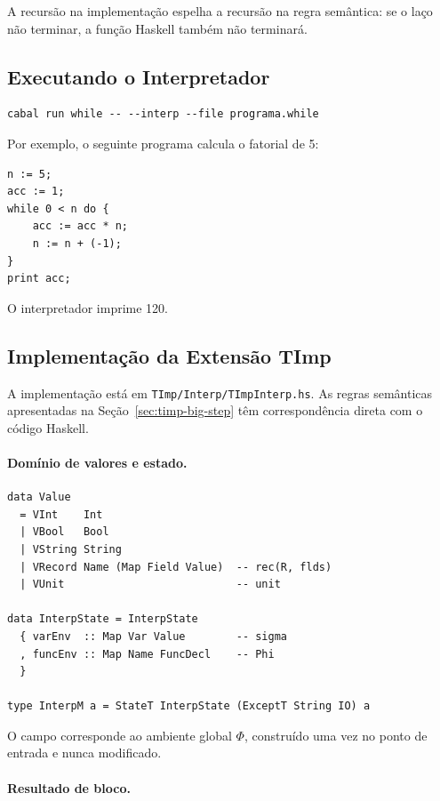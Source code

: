 A recursão na implementação espelha a recursão na regra semântica: se
o laço não terminar, a função Haskell também não terminará.

\subsection{Executando o Interpretador}

\begin{verbatim}
cabal run while -- --interp --file programa.while
\end{verbatim}

Por exemplo, o seguinte programa calcula o fatorial de 5:

\begin{verbatim}
n := 5;
acc := 1;
while 0 < n do {
    acc := acc * n;
    n := n + (-1);
}
print acc;
\end{verbatim}

O interpretador imprime 120.

\subsection{Implementação da Extensão TImp}

A implementação está em \verb|TImp/Interp/TImpInterp.hs|. As regras
semânticas apresentadas na Seção~\ref{sec:timp-big-step} têm
correspondência direta com o código Haskell.

\paragraph{Domínio de valores e estado.}

\begin{verbatim}
data Value
  = VInt    Int
  | VBool   Bool
  | VString String
  | VRecord Name (Map Field Value)  -- rec(R, flds)
  | VUnit                           -- unit

data InterpState = InterpState
  { varEnv  :: Map Var Value        -- sigma
  , funcEnv :: Map Name FuncDecl    -- Phi
  }

type InterpM a = StateT InterpState (ExceptT String IO) a
\end{verbatim}

O campo  corresponde ao ambiente global \(\Phi\),
construído uma vez no ponto de entrada e nunca modificado.

\paragraph{Resultado de bloco.}

